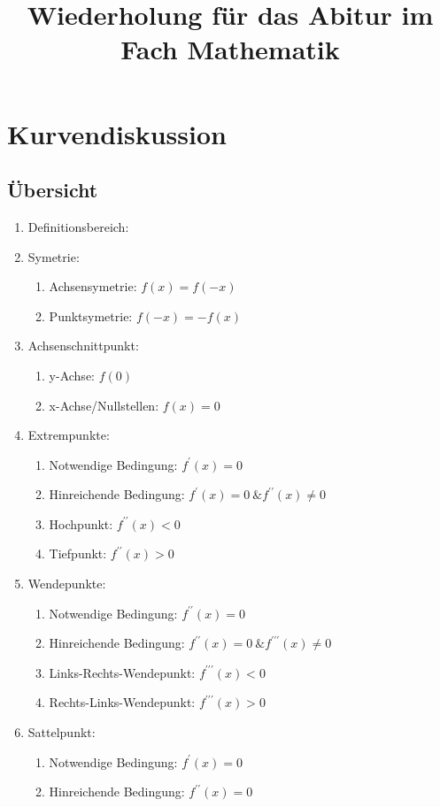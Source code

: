 \documentclass[a4paper,12pt]{article}
\title{Wiederholung für das Abitur im Fach Mathematik}
\date{}
\begin{document}
\maketitle
\section*{Kurvendiskussion}
	\subsection*{Übersicht}
		\begin{enumerate}
			\item Definitionsbereich:
			\item Symetrie:
				\begin{enumerate}
					\item Achsensymetrie: $f(x)=f(-x)$
					\item Punktsymetrie: $f(-x) = -f(x)$
				\end{enumerate}
			\item Achsenschnittpunkt:
				\begin{enumerate}
					\item y-Achse: $f(0)$
					\item x-Achse/Nullstellen: $f(x)=0$
				\end{enumerate}
			\item Extrempunkte:
				\begin{enumerate}
					\item Notwendige Bedingung: $f^{\prime}(x)=0$
					\item Hinreichende Bedingung: $f^{\prime}(x)=0 \ \& f^{\prime\prime}(x) \neq0$
					\item Hochpunkt: $f^{\prime\prime}(x) < 0$
					\item Tiefpunkt: $f^{\prime\prime}(x)>0$
				\end{enumerate}
			\item Wendepunkte:
				\begin{enumerate}
					\item Notwendige Bedingung: $f^{\prime\prime}(x)=0$
					\item Hinreichende Bedingung: $f^{\prime\prime}(x)=0 \ \& f^{\prime\prime\prime}(x) \neq0$
					\item Links-Rechts-Wendepunkt: $f^{\prime\prime\prime}(x) < 0$
					\item Rechts-Links-Wendepunkt: $f^{\prime\prime\prime}(x)>0$
				\end{enumerate}
			\item Sattelpunkt:
				\begin{enumerate}
					\item Notwendige Bedingung: $f^{\prime}(x)=0$
					\item Hinreichende Bedingung: $f^{\prime\prime}(x)=0$
				\end{enumerate}
		\end{enumerate}
\end{document}
